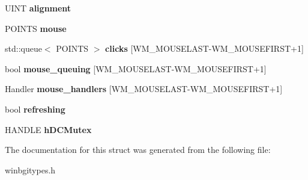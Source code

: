 \begin{DoxyCompactItemize}
\item 
U\+I\+NT {\bfseries alignment}\hypertarget{struct_window_data_a67fa750b8c9f3d0d9fd215998c92dd6f}{}\label{struct_window_data_a67fa750b8c9f3d0d9fd215998c92dd6f}

\item 
P\+O\+I\+N\+TS {\bfseries mouse}\hypertarget{struct_window_data_ab7f9c561ca9b3c3323140eb76664e4d3}{}\label{struct_window_data_ab7f9c561ca9b3c3323140eb76664e4d3}

\item 
std\+::queue$<$ P\+O\+I\+N\+TS $>$ {\bfseries clicks} \mbox{[}W\+M\+\_\+\+M\+O\+U\+S\+E\+L\+A\+ST-\/W\+M\+\_\+\+M\+O\+U\+S\+E\+F\+I\+R\+ST+1\mbox{]}\hypertarget{struct_window_data_a64a2fa79ec9b30cb53dd679a394a6c6d}{}\label{struct_window_data_a64a2fa79ec9b30cb53dd679a394a6c6d}

\item 
bool {\bfseries mouse\+\_\+queuing} \mbox{[}W\+M\+\_\+\+M\+O\+U\+S\+E\+L\+A\+ST-\/W\+M\+\_\+\+M\+O\+U\+S\+E\+F\+I\+R\+ST+1\mbox{]}\hypertarget{struct_window_data_aa7573c81ca479efd128a336f26b28924}{}\label{struct_window_data_aa7573c81ca479efd128a336f26b28924}

\item 
Handler {\bfseries mouse\+\_\+handlers} \mbox{[}W\+M\+\_\+\+M\+O\+U\+S\+E\+L\+A\+ST-\/W\+M\+\_\+\+M\+O\+U\+S\+E\+F\+I\+R\+ST+1\mbox{]}\hypertarget{struct_window_data_ac045ae173b9586f4c80615f7eb924e80}{}\label{struct_window_data_ac045ae173b9586f4c80615f7eb924e80}

\item 
bool {\bfseries refreshing}\hypertarget{struct_window_data_ab4c8f1fa26adb348e04cfeeef7970a10}{}\label{struct_window_data_ab4c8f1fa26adb348e04cfeeef7970a10}

\item 
H\+A\+N\+D\+LE {\bfseries h\+D\+C\+Mutex}\hypertarget{struct_window_data_af28a8ea5ed472a8562f42b74efffff31}{}\label{struct_window_data_af28a8ea5ed472a8562f42b74efffff31}

\end{DoxyCompactItemize}


The documentation for this struct was generated from the following file\+:\begin{DoxyCompactItemize}
\item 
winbgitypes.\+h\end{DoxyCompactItemize}

